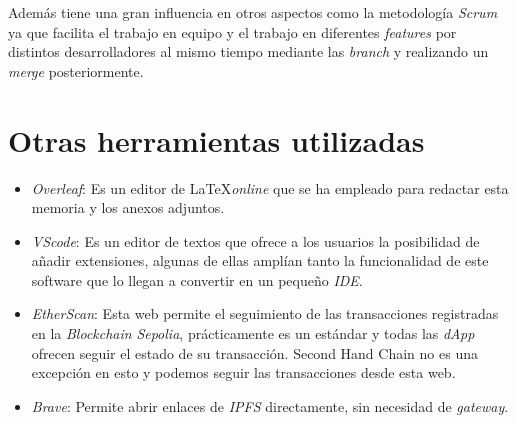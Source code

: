Además tiene una gran influencia en otros aspectos como la metodología \textit{Scrum} ya que facilita el trabajo en equipo y el trabajo en diferentes \textit{features} por distintos desarrolladores al mismo tiempo mediante las  \textit{branch} y realizando un \textit{merge} posteriormente.

\section{Otras herramientas utilizadas}
\begin{itemize}
    \item \textit{Overleaf}: Es un editor de \LaTeX \textit{online} que se ha empleado para redactar esta memoria y los anexos adjuntos.
    \item \textit{VScode}: Es un editor de textos que ofrece a los usuarios la posibilidad de añadir extensiones, algunas de ellas amplían tanto la funcionalidad de este software que lo llegan a convertir en un pequeño \textit{IDE}.
    \item \textit{EtherScan}: Esta web\cite{etherscanTESTNETSepolia} permite el seguimiento de las transacciones registradas en la \textit{Blockchain} \textit{Sepolia}, prácticamente es un estándar y todas las \textit{dApp} ofrecen seguir el estado de su transacción. Second Hand Chain no es una excepción en esto y podemos seguir las transacciones desde esta web.
    \item \textit{Brave}: Permite abrir enlaces de \textit{IPFS} directamente, sin necesidad de \textit{gateway}.
\end{itemize}